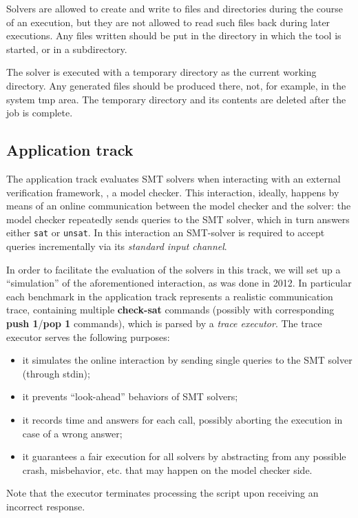 \documentclass[12pt]{article}
\newcommand{\akey}[1]{\textbf{#1}}
\begin{document}
Solvers are allowed to create and write to
files and directories during the course of an execution, but they are
not allowed to read such files back during later executions.  Any
files written should be put in the directory in which the tool is
started, or in a subdirectory.

The solver is executed with a temporary directory as the current working directory.
Any generated files should be produced there, not, for example, in the system tmp area.
The temporary directory and its contents are deleted after the job is complete.

\subsection{Application track}
\label{sec:exec:application}

The application track evaluates SMT solvers when interacting
with an external verification framework, \eg, a model
checker. This interaction, ideally, happens by means of an online
communication between the model checker and the solver: the model
checker repeatedly sends queries to the SMT solver, which in turn
answers either \texttt{sat} or \texttt{unsat}.  In this interaction an SMT-solver is
required to accept queries incrementally via its {\em standard input channel}.

In order to facilitate the evaluation of the solvers in this track, we
will set up a ``simulation'' of the aforementioned interaction, as was done in 2012. In
particular each benchmark in the application track represents a realistic
communication trace, containing multiple \akey{check-sat} commands (possibly
with corresponding \akey{push 1}/\akey{pop 1} commands), which
is parsed by a {\em trace executor}. The trace executor serves the following purposes:
\begin{itemize}
\item it simulates the online interaction by sending single queries to the SMT solver
      (through stdin);
\item it prevents ``look-ahead'' behaviors of SMT solvers;
\item it records time and answers for each call, possibly aborting the execution
      in case of a wrong answer;
\item it guarantees a fair execution for all solvers by abstracting from any possible
      crash, misbehavior, etc. that may happen on the model checker side.
\end{itemize}
Note that the executor terminates processing the script upon receiving an incorrect response.
\end{document}
